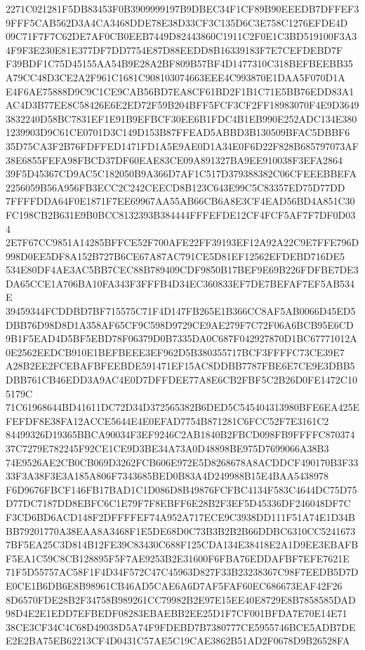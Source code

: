 \documentclass[UTF8,fontset=fandol,zihao=-4,a4paper]{ctexart}
\begin{document}
{{2271C021281F5DB83453F0B3909999197B9DBEC34F1CF89B90EEEDB7DFFEF39FFF5CAB562D3A4CA3468DDE78E38D33CF3C135D6C3E758C1276EFDE4D
09C71F7F7C62DE7AF0CB0EEB7449D82443860C1911C2F0E1C3BD519100F3A34F9F3E230E81E377DF7DD7754E87D88EEDD8B16339183F7E7CEFDEBD7F
F39BDF1C75D45155AA54B9E28A2BF809B57BF4D1477310C318BEFBEEBB35A79CC48D3CE2A2F961C1681C908103074663EEE4C993870E1DAA5F070D1A
E4F6AE75888D9C9C1CE9CAB56BD7EA8CF61BD2F1B1C71E5BB76EDD83A1AC4D3B77EE8C58426E6E2ED72F59B204BFF5FCF3CF2FF18983070F4E9D3649
3832240D58BC7831EF1E91B9EFBCF30EE6B1FDC4B1EB990E252ADC134E3801239903D9C61CE0701D3C149D153B87FFEAD5ABBD3B130509BFAC5DBBF6
35D75CA3F2B76FDFFED1471FD1A5E9AE0D1A34E0F6D22F828B685797073AF38E6855FEFA98FBCD37DF60EAE83CE09A891327BA9EE910038F3EFA2864
39F5D45367CD9AC5C182050B9A366D7AF1C517D379388382C06CFEEEBBEFA2256059B56A956FB3ECC2C242CEECD8B123C643E99C5C83357ED75D77DD
7FFFFDDA64F0E1871F7EE69967AA55AB66CB6A8E3CF4EAD56BD4A851C30FC198CB2B631E9B0BCC8132393B384444FFFEFDE12CF4FCF5AF7F7DF0D034
2E7F67CC9851A14285BFFCE52F700AFE22FF39193EF12A92A22C9E7FFE796D998D0EE5DF8A152B727B6CE67A87AC791CE5D81EF12562EFDEBD716DE5
534E80DF4AE3AC5BB7CEC88B789409CDF9850B17BEF9E69B226FDFBE7DE3DA65CCE1A706BA10FA343F3FFFB4D34EC360833EF7DE7BEFAF7EF5AB534E
39459344FCDDBD7BF715575C71F4D147FB265E1B366CC8AF5AB0066D45ED5DBB76D98D8D1A358AF65CF9C598D9729CE9AE279F7C72F06A6BCB95E6CD
9B1F5EAD4D5BF5EBD78F06379D0B7335DA0C687F042927870D1BC67771012A0E2562EEDCB910E1BEFBEEE3EF962D5B380355717BCF3FFFFC73CE39E7
A28B2EE2FCEBAFBFEEBDE591471EF15AC8DDBB7787FBE6E7CE9E3DBB5DBB761CB46EDD3A9AC4E0D7DFFDEE77A8E6CB2FBF5C2B26D0FE1472C105179C
71C61968644BD41611DC72D34D372565382B6DED5C545404313980BFE6EA425EFEFDF8E38FA12ACCE5644E4E0EFAD7754B871281C6FCC52F7E3161C2
84499326D19365BBCA90034F3EF9246C2AB1840B2FBCD098FB9FFFFC87037437C7279E782245F92CE1CE9D3BE34A73A0D48898BE975D7699066A38B3
74E9526AE2CB0CB069D3262FCB606E972E5D8268678A8ACDDCF490170B3F3333F3A38F3E3A185A806F7343685BED0B83A4D249988B15E4BAA5438978
F6D9676FBCF146FB17BAD1C1D086D8B49876FCFBC4134F583C4644DC75D75D77DC7187DD8EBFC6C1E79F7F8EBFF6E28B2F3EF5D45336DF246048DF7C
F3CD6BD6ACD148F2DFFFFEF74A952A717ECE9C3938DD111F51A74E1D34BBB79201770A38EAA8A3468F1E5DE68D0C73B3B2B2B66DDBC6310CC5241673
7BF5EA25C3D814B12FE39C83430C688F125CDA134E38418E2A1D9EE3EBAFBF5EA1C59C8CB128895F5F7AE9253B2E31600F6FBA76EDDAFBF7EFE7621E
71F5D55757AC58F1F4D34F572C47C45963D827F33B23238367C98F7EEDB5D7DE0CE1B6DB6E8B98961CB46AD5CAE6A6D7AF5FAF60EC686673EAF42F26
8D6570FDE28B2F34758B989261CC79982B2E97E15EE40E8729E8B7858585DAD98D4E2E1EDD7EFBEDF08283EBAEBB2EE25D1F7CF001BFDA7E70E14E71
38CE3CF34C4C68D49038D5A74F9FDEBD7B7380777CE5955746BCE5ADB7DEE2E2BA75EB62213CF4D0431C57AE5C19CAE3862B51AD2F0678D9B26528FA
}}
\end{document}

